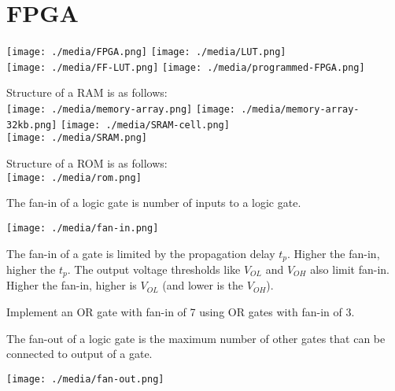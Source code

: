 
\section{FPGA~\cite[Section~B.6.5]{stephen2022fundamentals}}

\texttt{[image: ./media/FPGA.png]}
\texttt{[image: ./media/LUT.png]}\\
\texttt{[image: ./media/FF-LUT.png]}
\texttt{[image: ./media/programmed-FPGA.png]}


\begin{definition} Structure of a RAM is as follows:\\
  \texttt{[image: ./media/memory-array.png]}
  \texttt{[image: ./media/memory-array-32kb.png]}
  \texttt{[image: ./media/SRAM-cell.png]}\\
  \texttt{[image: ./media/SRAM.png]}
\end{definition}

\begin{definition} Structure of a ROM is as follows:\\
  \texttt{[image: ./media/rom.png]}
\end{definition}


\begin{definition}[Fan-in]
  The fan-in of a logic gate is number of  inputs to a logic gate.~\cite[Section~B.8.9]{stephen2022fundamentals}
\end{definition}
\texttt{[image: ./media/fan-in.png]}

\begin{remark}[Fan-in]
  The fan-in of a gate is limited by the propagation delay $t_p$. Higher the
  fan-in, higher the $t_p$. The output
  voltage thresholds like $V_{OL}$ and $V_{OH}$ also limit fan-in. Higher the
  fan-in, higher is $V_{OL}$ (and lower is the $V_{OH}$).
\end{remark}

\begin{example}
  Implement an OR gate with fan-in of 7 using OR gates with fan-in of 3.
\end{example}
\vspace{5em}

\begin{definition}
  The fan-out of a logic gate is the maximum number of other gates that can be connected
  to output of a gate.~\cite[Section~B.8.9]{stephen2022fundamentals}
\end{definition}
\texttt{[image: ./media/fan-out.png]}

